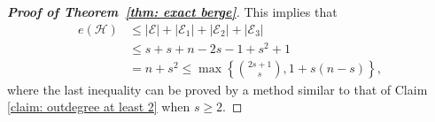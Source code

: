 \documentclass[11pt]{article}
\numberwithin{equation}{section}
\newcommand\cC{{\mathcal C}}
\newcommand\cE{{\mathcal E}}
\newcommand\cH{{\mathcal H}}
\begin{document}
\begin{proof}[\bf Proof of Theorem~\ref{thm: exact berge}]


    This implies that
    \begin{equation*}
    \begin{aligned}
        e(\cH) & \le |\cE|+|\cE_1| + |\cE_2| + |\cE_3|\\
        &\leq s + s + n-2s-1 +s^2+1 \\
               & = n + s^2  \le \max\left\{ \binom{2s+1}{s}, 1+s(n-s) \right\},
    \end{aligned}
    \end{equation*}
    where the last inequality can be proved by a method similar to that of Claim \ref{claim: outdegree at least 2} when $s\geq2$.




\end{proof}
\end{document}
